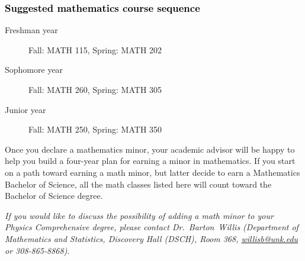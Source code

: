 \documentclass[10pt]{article}
\makeatletter
\newcommand{\contactbw}{\mbox{Dr.\ Barton Willis} (Department of Mathematics and Statistics,  Discovery Hall (DSCH), Room 368,
\href{mailto:willisb@unk.edu}{willisb@unk.edu} or 308-865-8868)}
\makeatother
\begin{document}
\subsubsection*{\textcolor{black}{Suggested mathematics course sequence}}

\begin{description}
   \item[\phantom{xxx} Freshman year] Fall: MATH 115, Spring:  MATH 202
      \item[\phantom{xxx} Sophomore year]  Fall: MATH 260,  Spring: MATH 305
     \item[\phantom{xxx} Junior year]  Fall: MATH 250,  Spring: MATH 350
 \end{description}
  \vspace{0.1in}

 \noindent Once you declare a mathematics minor, your academic advisor will be happy to help you build a four-year plan for earning a minor in mathematics.  If you start on a path toward earning a math minor, but latter decide to earn a  Mathematics Bachelor of Science, all the math classes listed here will count toward the Bachelor of Science degree.

   \vspace{0.1in}

\noindent \textcolor{unkblue}{\emph{If you would like to discuss the possibility of  adding a math minor to your Physics Comprehensive degree, please contact \contactbw.}}
\end{document}
